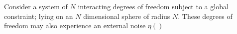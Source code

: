 Consider a system of $N$ interacting degrees of freedom subject to a global constraint; lying on an $N$ dimensional sphere of radius $N$. These degrees of freedom may also experience an external noise $\eta()$